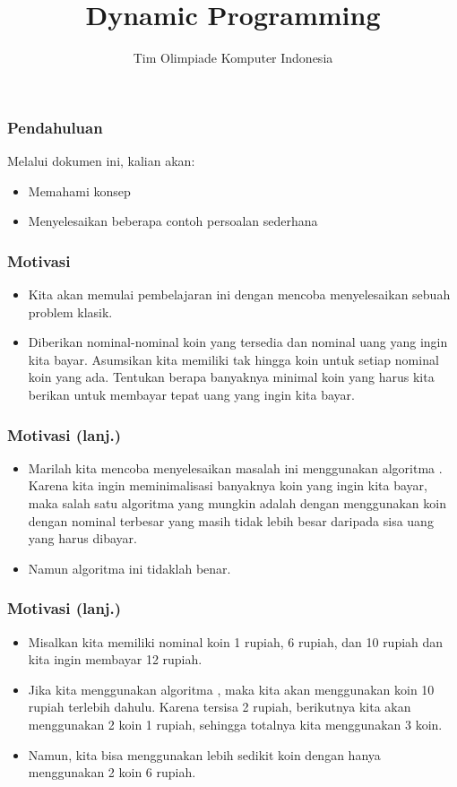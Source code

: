 

\title{Dynamic Programming}
\author{Tim Olimpiade Komputer Indonesia}
\date{}

\usepackage{qtree}


\begin{frame}
\titlepage
\end{frame}

\begin{frame}
\frametitle{Pendahuluan}
Melalui dokumen ini, kalian akan:
\begin{itemize}
  \item Memahami konsep 
  \item Menyelesaikan beberapa contoh persoalan  sederhana
\end{itemize}
\end{frame}

\begin{frame}
\frametitle{Motivasi}
\begin{itemize}
  \item Kita akan memulai pembelajaran ini dengan mencoba menyelesaikan sebuah problem klasik.
  \item Diberikan nominal-nominal koin yang tersedia dan nominal uang yang ingin kita bayar. Asumsikan kita memiliki tak hingga koin untuk setiap nominal koin yang ada. Tentukan berapa banyaknya minimal koin yang harus kita berikan untuk membayar tepat uang yang ingin kita bayar.
\end{itemize}
\end{frame}

\begin{frame}
\frametitle{Motivasi (lanj.)}
\begin{itemize}
  \item Marilah kita mencoba menyelesaikan masalah ini menggunakan algoritma . Karena kita ingin meminimalisasi banyaknya koin yang ingin kita bayar, maka salah satu algoritma  yang mungkin adalah dengan menggunakan koin dengan nominal terbesar yang masih tidak lebih besar daripada sisa uang yang harus dibayar.
   \item Namun algoritma  ini tidaklah benar.
 \end{itemize}
\end{frame}

\begin{frame}
\frametitle{Motivasi (lanj.)}
\begin{itemize}
  \item Misalkan kita memiliki nominal koin 1 rupiah, 6 rupiah, dan 10 rupiah dan kita ingin membayar 12 rupiah.
  \item Jika kita menggunakan algoritma , maka kita akan menggunakan koin 10 rupiah terlebih dahulu. Karena tersisa 2 rupiah, berikutnya kita akan menggunakan 2 koin 1 rupiah, sehingga totalnya kita menggunakan 3 koin.
   \item Namun, kita bisa menggunakan lebih sedikit koin dengan hanya menggunakan 2 koin 6 rupiah.
 \end{itemize}
\end{frame}

